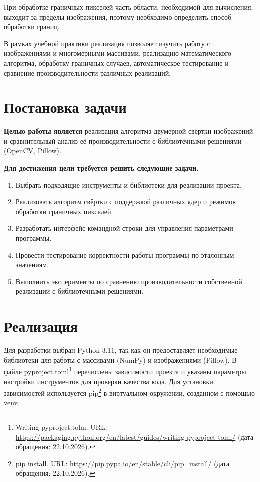 \documentclass[a4paper]{article}
\begin{document}
При обработке граничных пикселей часть области, необходимой для вычисления, выходит за пределы изображения, поэтому необходимо определить способ обработки границ.

В рамках учебной практики реализация позволяет изучить работу с изображениями и многомерными массивами, реализацию математического алгоритма, обработку граничных случаев, автоматическое тестирование и сравнение производительности различных реализаций.

\section{Постановка задачи}

\textbf{Целью работы является} реализация алгоритма двумерной свёртки изображений и сравнительный анализ её производительности с библиотечными решениями (OpenCV, Pillow).

\textbf{Для достижения цели требуется решить следующие задачи.}

\begin{enumerate}
    \item Выбрать подходящие инструменты и библиотеки для реализации проекта.
    \item Реализовать алгоритм свёртки с поддержкой различных ядер и режимов обработки граничных пикселей.
    \item Разработать интерфейс командной строки для управления параметрами программы.
    \item Провести тестирование корректности работы программы по эталонным значениям.
    \item Выполнить эксперименты по сравнению производительности собственной реализации с библиотечными решениями.
\end{enumerate}

\section{Реализация}

Для разработки выбран Python 3.11, так как он предоставляет необходимые библиотеки для работы с массивами (NumPy) и изображениями (Pillow). В файле pyproject.toml\footnote{Writing pyproject.tolm. URL: \url{https://packaging.python.org/en/latest/guides/writing-pyproject-toml/} (дата обращения: 22.10.2026).} перечислены зависимости проекта и указаны параметры настройки инструментов для проверки качества кода. Для установки зависимостей используется pip\footnote{pip install. URL: \url{https://pip.pypa.io/en/stable/cli/pip_install/} (дата обращения: 22.10.2026).} в виртуальном окружении, созданном с помощью venv.
\end{document}
